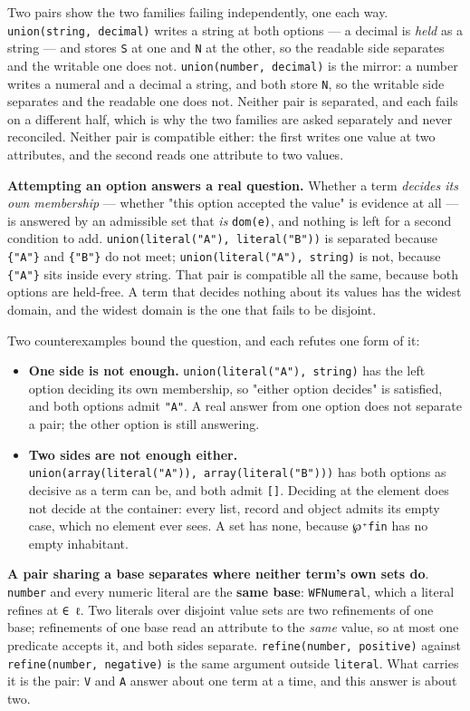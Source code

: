 Two pairs show the two families failing independently, one each way. \texttt{union(string,\ decimal)} writes a string at both options — a decimal is \emph{held} as a string — and
stores \texttt{S} at one and \texttt{N} at the other, so the readable side separates and the writable one does
not. \texttt{union(number,\ decimal)} is the mirror: a number writes a numeral and a decimal a string, and
both store \texttt{N}, so the writable side separates and the readable one does not. Neither pair is
separated, and each fails on a different half, which is why the two families are asked separately and
never reconciled. Neither pair is compatible either: the first writes one value at two attributes,
and the second reads one attribute to two values.

\textbf{Attempting an option answers a real question.} Whether a term \emph{decides its own membership} —
whether "this option accepted the value" is evidence at all — is answered by an admissible set that
\emph{is} \texttt{dom(e)}, and nothing is left for a second condition to add. \texttt{union(literal("A"),\ literal("B"))} is separated
because \texttt{\{"A"\}} and \texttt{\{"B"\}} do not meet; \texttt{union(literal("A"),\ string)} is not, because \texttt{\{"A"\}} sits
inside every string. That pair is compatible all the same, because both options are held-free. A term that decides nothing about its values has the widest domain, and the
widest domain is the one that fails to be disjoint.

Two counterexamples bound the question, and each refutes one form of it:

\begin{itemize}
\tightlist
\item
  \textbf{One side is not enough.} \texttt{union(literal("A"),\ string)} has the left option deciding its own
  membership, so "either option decides" is satisfied, and both options admit \texttt{"A"}. A real answer
  from one option does not separate a pair; the other option is still answering.
\item
  \textbf{Two sides are not enough either.} \texttt{union(array(literal("A")),\ array(literal("B")))} has both
  options as decisive as a term can be, and both admit \texttt{{[}{]}}. Deciding at the element does not
  decide at the container: every list, record and object admits its empty case, which no element
  ever sees. A set has none, because \texttt{℘⁺fin} has no empty inhabitant.
\end{itemize}

\textbf{A pair sharing a base separates where neither term's own sets do}. \texttt{number} and
every numeric literal are the \textbf{same base}: \texttt{WFNumeral}, which a literal refines at
\texttt{∈\ ℓ}. Two literals over disjoint
value sets are two refinements of one base; refinements of one base read an attribute to the \emph{same}
value, so at most one predicate accepts it, and both sides separate.
\texttt{refine(number,\ positive)} against \texttt{refine(number,\ negative)} is the same argument outside \texttt{literal}.
What carries it is the pair: \texttt{V} and \texttt{A} answer about one term at a time, and this answer is about
two.

